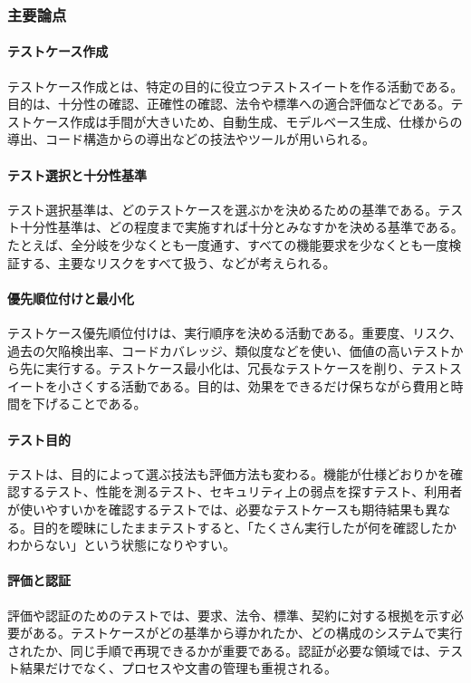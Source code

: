 \subsubsection{主要論点}
\paragraph{テストケース作成}
テストケース作成とは、特定の目的に役立つテストスイートを作る活動である。目的は、十分性の確認、正確性の確認、法令や標準への適合評価などである。テストケース作成は手間が大きいため、自動生成、モデルベース生成、仕様からの導出、コード構造からの導出などの技法やツールが用いられる。

\paragraph{テスト選択と十分性基準}
テスト選択基準は、どのテストケースを選ぶかを決めるための基準である。テスト十分性基準は、どの程度まで実施すれば十分とみなすかを決める基準である。たとえば、全分岐を少なくとも一度通す、すべての機能要求を少なくとも一度検証する、主要なリスクをすべて扱う、などが考えられる。

\paragraph{優先順位付けと最小化}
テストケース優先順位付けは、実行順序を決める活動である。重要度、リスク、過去の欠陥検出率、コードカバレッジ、類似度などを使い、価値の高いテストから先に実行する。テストケース最小化は、冗長なテストケースを削り、テストスイートを小さくする活動である。目的は、効果をできるだけ保ちながら費用と時間を下げることである。

\paragraph{テスト目的}
テストは、目的によって選ぶ技法も評価方法も変わる。機能が仕様どおりかを確認するテスト、性能を測るテスト、セキュリティ上の弱点を探すテスト、利用者が使いやすいかを確認するテストでは、必要なテストケースも期待結果も異なる。目的を曖昧にしたままテストすると、「たくさん実行したが何を確認したかわからない」という状態になりやすい。

\paragraph{評価と認証}
評価や認証のためのテストでは、要求、法令、標準、契約に対する根拠を示す必要がある。テストケースがどの基準から導かれたか、どの構成のシステムで実行されたか、同じ手順で再現できるかが重要である。認証が必要な領域では、テスト結果だけでなく、プロセスや文書の管理も重視される。

